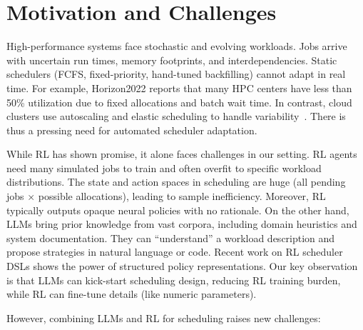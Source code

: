 \section{Motivation and Challenges}

High-performance systems face stochastic and evolving workloads. Jobs arrive with uncertain run times, memory footprints, and interdependencies. Static schedulers (FCFS, fixed-priority, hand-tuned backfilling) cannot adapt in real time. For example, Horizon2022 reports that many HPC centers have less than 50\% utilization due to fixed allocations and batch wait time. In contrast, cloud clusters use autoscaling and elastic scheduling to handle variability~\cite{arxiv2401}. There is thus a pressing need for automated scheduler adaptation.

While RL has shown promise, it alone faces challenges in our setting. RL agents need many simulated jobs to train and often overfit to specific workload distributions. The state and action spaces in scheduling are huge (all pending jobs $\times$ possible allocations), leading to sample inefficiency. Moreover, RL typically outputs opaque neural policies with no rationale. On the other hand, LLMs bring prior knowledge from vast corpora, including domain heuristics and system documentation. They can ``understand'' a workload description and propose strategies in natural language or code. Recent work on RL scheduler DSLs shows the power of structured policy representations. Our key observation is that LLMs can kick-start scheduling design, reducing RL training burden, while RL can fine-tune details (like numeric parameters).

However, combining LLMs and RL for scheduling raises new challenges:

